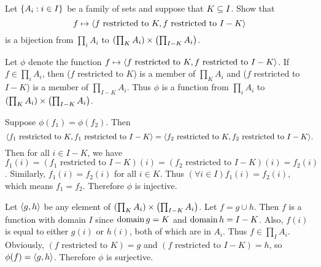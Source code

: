 \begin{exercise}
Let $\left\{ A_i : i\in I \right\}$ be a family of sets and suppose that $K\subseteq I$.
Show that
\[f\mapsto \left\langle f\text{ restricted to }K, f\text{ restricted to }I - K\right\rangle\]
is a bijection from $\prod_i A_i$ to $\left(\prod_K A_i\right)\times\left(\prod_{I-K} A_i\right)$.
\end{exercise}

\begin{solution}
Let $\phi$ denote the function $f\mapsto \left\langle f\text{ restricted to }K, f\text{ restricted to }I - K\right\rangle$.
If $f\in \prod_i A_i$, then ($f$ restricted to $K$) is a member of $\prod_K A_i$ and
($f$ restricted to $I-K$) is a member of $\prod_{I-K} A_i$. Thus $\phi$ is a function from
$\prod_i A_i$ to $\left(\prod_K A_i\right)\times\left(\prod_{I-K} A_i\right)$.

Suppose $\phi(f_1)=\phi(f_2)$. Then
\[\aprn{f_1\text{ restricted to }K, f_1\text{ restricted to }I - K} = \aprn{f_2\text{ restricted to }K, f_2\text{ restricted to }I - K}.\]
Then for all $i\in I-K$, we have $f_1(i)=(f_1\text{ restricted to }I - K)(i)=(f_2\text{ restricted to }I - K)(i)=f_2(i)$.
Similarly, $f_1(i)=f_2(i)$ for all $i\in K$.
Thus $(\forall i\in I)f_1(i)=f_2(i)$, which means $f_1 = f_2$.
Therefore $\phi$ is injective.

Let $\left\langle g,h\right\rangle$ be any element of $\left(\prod_K A_i\right)\times\left(\prod_{I-K} A_i\right)$.
Let $f=g\cup h$. Then $f$ is a function with domain $I$ since $\operatorname{domain} g = K$ and $\operatorname{domain} h=I-K$.
Also, $f(i)$ is equal to either $g(i)$ or $h(i)$, both of which are in $A_i$.
Thus $f\in\prod_I A_i$. Obviously, $(f\text{ restricted to }K)=g$
and $(f\text{ restricted to }I-K)=h$, so $\phi(f)=\left\langle g, h\right\rangle$. Therefore $\phi$ is surjective.
\end{solution}
